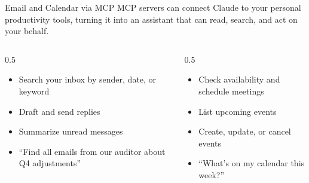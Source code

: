 \documentclass[aspectratio=169]{beamer}
\begin{document}
\begin{frame}{Email and Calendar via MCP}
MCP servers can connect Claude to your personal productivity tools, turning it into an assistant that can \alert{read, search, and act} on your behalf.
\vspace{0.3cm}
\begin{columns}[T]
\begin{column}{0.5\textwidth}
\begin{shadedbox}[title=\textbf{Email (Gmail)}]
\begin{itemize}\small
  \item Search your inbox by sender, date, or keyword
  \item Draft and send replies
  \item Summarize unread messages
  \item ``Find all emails from our auditor about Q4 adjustments''
\end{itemize}
\end{shadedbox}
\end{column}
\begin{column}{0.5\textwidth}
\begin{shadedbox}[title=\textbf{Calendar (Google Calendar)}]
\begin{itemize}\small
  \item Check availability and schedule meetings
  \item List upcoming events
  \item Create, update, or cancel events
  \item ``What's on my calendar this week?''
\end{itemize}
\end{shadedbox}
\end{column}
\end{columns}
\end{frame}
\end{document}
